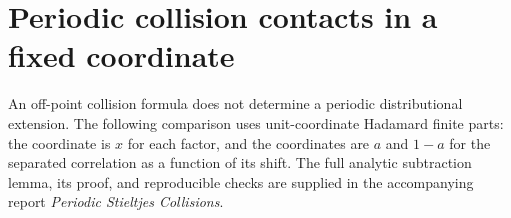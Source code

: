 \providecommand{\pccFP}{\operatorname{FP}}
\providecommand{\pccH}{\mathsf H}
\providecommand{\pccD}{\mathrm D}
\providecommand{\pccP}{\mathcal P}
\providecommand{\pccB}{\mathcal B}
\section{Periodic collision contacts in a fixed coordinate}
\label{pcc:section}
An off-point collision formula does not determine a periodic distributional
extension. The following comparison uses unit-coordinate Hadamard finite
parts: the coordinate is $x$ for each factor, and the coordinates are $a$ and
$1-a$ for the separated correlation as a function of its shift. The full
analytic subtraction lemma, its proof, and reproducible checks are supplied
in the accompanying report \emph{Periodic Stieltjes Collisions}.

